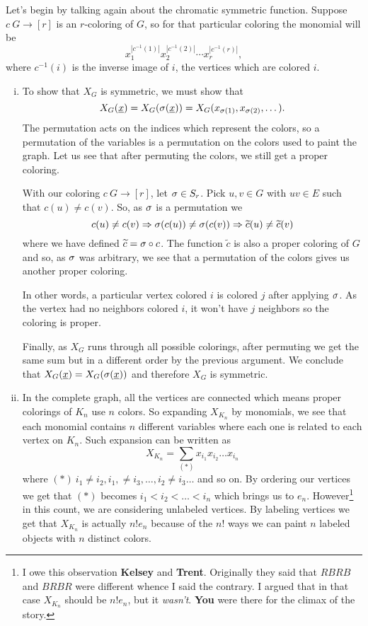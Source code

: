 \documentclass[12pt]{memoir}
\begin{document}
\begin{ptcbr}
    Let's begin by talking again about the chromatic symmetric function. Suppose $c\: G\to[r]$ is an $r$-coloring of $G$, so for that particular coloring the monomial will be 
    $$x_1^{|c^{-1}(1)|}x_2^{|c^{-1}(2)|}\cdots x_r^{|c^{-1}(r)|},$$ where $c^{-1}(i)$ is the inverse image of $i$, the vertices which are colored $i$.
    \begin{enumerate}[i)]
    \itemsep=-0.4em
    \item To show that $X_G$ is symmetric, we must show that 
    $$X_G(\underline{x})=X_G(\sigma(\underline x))=X_G(x_{\sigma(1)},x_{\sigma(2)},\dots).$$
    The permutation acts on the indices which represent the colors, so a permutation of the variables is a permutation on the colors used to paint the graph. Let us see that after permuting the colors, we still get a proper coloring.\par 
    With our coloring $c\: G\to[r]$, let $\sigma\in S_r$. Pick $u,v\in G$ with $uv\in E$ such that $c(u)\neq c(v)$. So, as $\sigma$ is a permutation we
    $$c(u)\neq c(v)\Rightarrow\sigma(c(u))\neq\sigma(c(v))\Rightarrow \widetilde{c}(u)\neq \widetilde{c}(v)$$
    where we have defined $\widetilde{c}=\sigma\circ c$. The function $\widetilde{c}$ is also a proper coloring of $G$ and so, as $\sigma$ was arbitrary, we see that a permutation of the colors gives us another proper coloring.\par 
    In other words, a particular vertex colored $i$ is colored $j$ after applying $\sigma$. As the vertex had no neighbors colored $i$, it won't have $j$ neighbors so the coloring is proper.\par
    Finally, as $X_G$ runs through all possible colorings, after permuting we get the same sum but in a different order by the previous argument. We conclude that $X_G(\underline{x})=X_G(\sigma(\underline x))$ and therefore $X_G$ is symmetric.
    \item In the complete graph, all the vertices are connected which means proper colorings of $K_n$ use $n$ colors. So expanding $X_{K_n}$ by monomials, we see that each monomial contains $n$ different variables where each one is related to each vertex on $K_n$. Such expansion can be written as 
    $$X_{K_n}=\sum_{(\ast)}x_{i_1}x_{i_2}\dots x_{i_n}$$
    where $(\ast)\: i_1\neq i_2, i_1,\neq i_3,\dots,i_2\neq i_3\dots$ and so on. By ordering our vertices we get that $(\ast)$ becomes $i_1<i_2<\dots<i_n$ which brings us to $e_n$. However\footnote{I owe this observation \textbf{Kelsey} and \textbf{Trent}. Originally they said that $RBRB$ and $BRBR$ were different whence I said the contrary. I argued that in that case $X_{K_n}$ should be $n!e_n$, but it \emph{wasn't}. \textbf{You} were there for the climax of the story.} in this count, we are considering unlabeled vertices. By labeling vertices we get that $X_{K_n}$ is actually $n!e_n$ because of the $n!$ ways we can paint $n$ labeled objects with $n$ distinct colors.

\end{enumerate}
\end{ptcbr}
\end{document}
